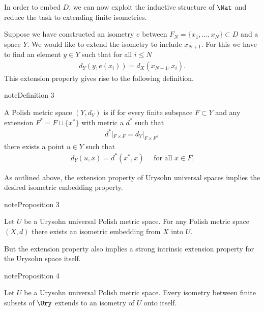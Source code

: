\documentclass[letterpaper,10pt,english]{jupyterBook}
\begin{document}
\sphinxAtStartPar
In order to embed \(D\), we can now exploit the inductive structure of \(\Nat\) and reduce the task to extending finite isometries.

\sphinxAtStartPar
Suppose we have constructed an isometry \(e\) between \(F_N = \{x_1, \dots, x_N \} \subset D\) and a space \(Y\). We would like to extend the isometry to include \(x_{N+1}\). For this we have to find an element \(y \in Y\) such that for all \(i \leq N\)
\begin{equation*}
\begin{split}
	d_Y(y, e(x_i)) = d_X(x_{N+1}, x_i).
\end{split}
\end{equation*}
\sphinxAtStartPar
This extension property gives rise to the following definition.
\label{Urysohn:definition-2}
\begin{sphinxadmonition}{note}{Definition 3}



\sphinxAtStartPar
A Polish metric space \((Y,d_Y)\) is  if for every finite subspace \(F \subset Y\) and any extension \(F^* = F \cup \{x^*\}\) with metric a \(d^*\) such that
\begin{equation*}
\begin{split}
	d^*|_{F\times F} = d_Y|_{F\times F},
\end{split}
\end{equation*}
\sphinxAtStartPar
there exists a point \(u \in Y\) such that
\begin{equation*}
\begin{split}
	d_{Y}(u,x) = d^*(x^*,x) \quad \text{ for all $x \in F$}.
\end{split}
\end{equation*}\end{sphinxadmonition}

\sphinxAtStartPar
As outlined above, the extension property of Urysohn universal spaces implies the desired isometric embedding property.
\label{Urysohn:prop-Urysohn-embedding}
\begin{sphinxadmonition}{note}{Proposition 3}



\sphinxAtStartPar
Let \(U\) be a Urysohn universal Polish metric space. For any Polish metric space \((X,d)\) there exists an isometric embedding from \(X\) into \(U\).
\end{sphinxadmonition}

\sphinxAtStartPar
But the extension property also implies a strong intrinsic extension property for the Urysohn space itself.
\label{Urysohn:prop-Urysohn-extension}
\begin{sphinxadmonition}{note}{Proposition 4}



\sphinxAtStartPar
Let \(U\) be a Urysohn universal Polish metric space. Every isometry between finite subsets of \(\Ury\) extends to an isometry of \(U\) onto itself.
\end{sphinxadmonition}
\end{document}
